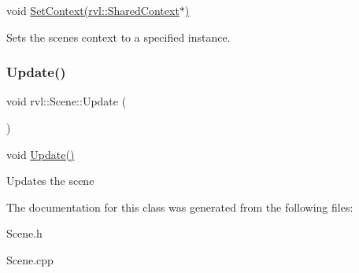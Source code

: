 void \hyperlink{classrvl_1_1_scene_ae45e2625cb99dd8ccb4a304fa70791bb}{Set\+Context(rvl\+::\+Shared\+Context$\ast$)} 

Sets the scenes context to a specified instance. \mbox{\label{classrvl_1_1_scene_ae6675125abb9ee6dc2e1be81aef3e270}} 
\subsubsection{\texorpdfstring{Update()}{Update()}}
{\footnotesize\ttfamily void rvl\+::\+Scene\+::\+Update (\begin{DoxyParamCaption}{ }\end{DoxyParamCaption})}



void \hyperlink{classrvl_1_1_scene_ae6675125abb9ee6dc2e1be81aef3e270}{Update()} 

Updates the scene 

The documentation for this class was generated from the following files\+:\begin{DoxyCompactItemize}
\item 
Scene.\+h\item 
Scene.\+cpp\end{DoxyCompactItemize}
